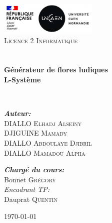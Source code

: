 \begin{titlepage}
\begin{center}

\includegraphics[width=0.35\textwidth]{images/logo}~\\[1cm]

\textsc{\LARGE Licence 2 Informatique}\\[1.5cm]

\textsc{\Large }\\[0.5cm]

\HRule \\[0.4cm]

{\huge \bfseries Générateur de flores ludiques\\
L-Système \\[0.4cm] }

\HRule \\[1.5cm]

\begin{minipage}{0.4\textwidth}
\begin{flushleft} \large
\emph{\bfseries Auteur:}\\
DIALLO \textsc{Elhadj Alseiny}\\
DJIGUINE \textsc{Mamady}\\
DIALLO \textsc{Abdoulaye Djibril}\\
DIALLO \textsc{Mamadou Alpha}
\end{flushleft}
\end{minipage}
\begin{minipage}{0.4\textwidth}
\begin{flushright} \large
\emph{\bfseries Chargé du cours:} \\
Bonnet \textsc{Grégory}\\
\emph{Encadrant TP:} \\
Dauprat \textsc{Quentin}
\end{flushright}
\end{minipage}

\vfill

{\large \today}

\end{center}
\end{titlepage}